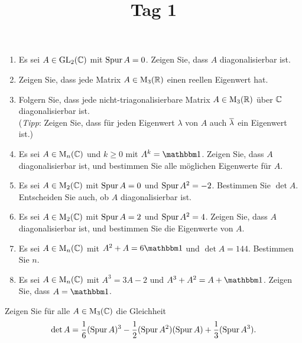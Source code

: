 \documentclass[a4paper, 10pt]{scrartcl}
\title{Tag 1}
\author{}
\date{}
\begin{document}
\begin{question}[subtitle = Eigenwerte und Diagonalisierbarkeit]
  \begin{enumerate}
    \item
      Es sei $A \in \operatorname{GL}_{2}(\mathbb{C})$ mit $\operatorname{Spur} A = 0$.
      Zeigen Sie, dass $A$ diagonalisierbar ist.
    \item
      Zeigen Sie, dass jede Matrix $A \in \operatorname{M}_{3}(\mathbb{R})$ einen reellen Eigenwert hat.
    \item
      Folgern Sie, dass jede nicht-triagonalisierbare Matrix $A \in \operatorname{M}_{3}(\mathbb{R})$ über $\mathbb{C}$ diagonalisierbar ist.
      \\
      (\emph{Tipp}:
       Zeigen Sie, dass für jeden Eigenwert $\lambda$ von $A$ auch $\overline{\lambda}$ ein Eigenwert ist.)
    \item
      Es sei $A \in \operatorname{M}_{n}(\mathbb{C})$ und $k \geq 0$ mit $A^k = \Id$.
      Zeigen Sie, dass $A$ diagonalisierbar ist, und bestimmen Sie alle möglichen Eigenwerte für $A$.
    \item
      Es sei $A \in \operatorname{M}_{2}(\mathbb{C})$ mit $\operatorname{Spur} A = 0$ und $\operatorname{Spur} A^2 = -2$.
      Bestimmen Sie $\det A$.
      Entscheiden Sie auch, ob $A$ diagonalisierbar ist.
    \item
      Es sei $A \in \operatorname{M}_{2}(\mathbb{C})$ mit $\operatorname{Spur} A = 2$ und $\operatorname{Spur} A^2 = 4$.
      Zeigen Sie, dass $A$ diagonalisierbar ist, und bestimmen Sie die Eigenwerte von $A$.
    \item
      Es sei $A \in \operatorname{M}_{n}(\mathbb{C})$ mit $A^2 + A = 6 \Id$ und $\det A = 144$.
      Bestimmen Sie $n$.
    \item
      Es sei $A \in \operatorname{M}_{n}(\mathbb{C})$ mit $A^3 = 3A - 2$ und $A^3 + A^2 = A + \Id$.
      Zeigen Sie, dass $A = \Id$.
  \end{enumerate}
\end{question}





\begin{question}[subtitle = Determinante und Potenzen der Spur]
  Zeigen Sie für alle $A \in \operatorname{M}_{3}(\mathbb{C})$ die Gleichheit
  \[
      \det A
    =   \frac{1}{6} (\operatorname{Spur} A)^3
      - \frac{1}{2} (\operatorname{Spur} A^2)(\operatorname{Spur} A)
      + \frac{1}{3} (\operatorname{Spur} A^3).
  \]
\end{question}
\end{document}

